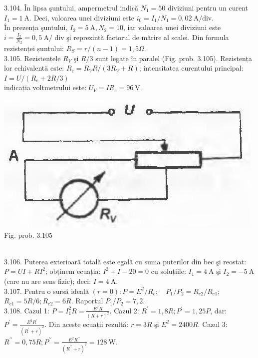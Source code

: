 3.104. În lipsa şuntului, ampermetrul indică $N_{1}=50$ diviziuni pentru un curent $I_{1}=1 \mathrm{~A}$. Deci, valoarea unei diviziuni este $i_{0}=I_{1} / N_{1}=0,02 \mathrm{~A} / \mathrm{div}$.\\ În prezența şuntului, $I_{2}=5 \mathrm{~A}, N_{2}=10$, iar valoarea unei diviziuni este $i=\frac{I_{2}}{N_{2}}=0,5 \mathrm{~A} /$ div şi reprezintă factorul de mărire al scalei. Din formula rezistenței șuntului: $R_{S}=r /(n-1)=1,5 \Omega$.\\

3.105. Rezistențele $R_{V}$ şi $R / 3$ sunt legate în paralel (Fig. prob. 3.105). Rezistența lor echivalentă este: $R_{e}=R_{V} R /\left(3 R_{V}+R\right)$; intensitatea curentului principal:\\ $I=U /\left(R_{e}+2 R / 3\right)$\\ indicația voltmetrului este: $U_{V}=I R_{e}=96 \mathrm{~V}$.\\ \begin{center} \includegraphics[max width=\textwidth]{images/2025_07_01_5b3ff9fa0d508c8e9f17g-362}\\ Fig. prob. 3.105 \end{center}\\

3.106. Puterea exterioară totală este egală cu suma puterilor din bec şi reostat: $P=U I+R I^{2}$; obținem ecuația: $I^{2}+I-20=0$ cu soluțiile: $I_{1}=4 \mathrm{~A}$ şi $I_{2}=-5 \mathrm{~A}$ (care nu are sens fizic); deci: $I=4 \mathrm{~A}$.\\

3.107. Pentru o sursă ideală $(r=0): P=E^{2} / R_{e} ; \quad P_{1} / P_{2}=R_{e 2} / R_{e 1}$; $R_{e 1}=5 R / 6 ; R_{e 2}=6 R$. Raportul $P_{1} / P_{2}=7,2$.\\

3.108. Cazul 1: $P=I_{1}^{2} R=\frac{E^{2} R}{(R+r)^{2}}$. Cazul 2: $R^{\prime}=1,8 R ; P^{\prime}=1,25 P$, dar: $P^{\prime}=\frac{E^{2} R^{\prime}}{\left(R^{\prime}+r\right)^{2}}$. Din aceste ecuații rezultă: $r=3 R$ şi $E^{2}=2400 R$. Cazul 3: $R^{\prime \prime}=0,75 R ; P^{\prime \prime}=\frac{E^{2} R^{\prime \prime}}{\left(R^{\prime \prime}+r\right)^{2}}=128 \mathrm{~W}$.\\

